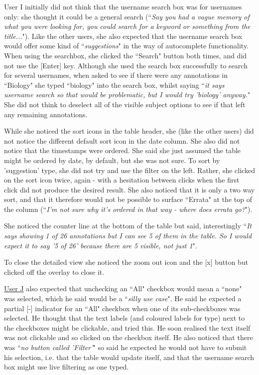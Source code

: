 User I initially did not think that the username search box was for usernames only: she thought it could be a general search (``\textit{Say you had a vague memory of what you were looking for, you could search for a keyword or something from the title...}"). Like the other users, she also expected that the username search box would offer some kind of ``\textit{suggestions}" in the way of autocomplete functionality. When using the searchbox, she clicked the ``Search" button both times, and did not use the [Enter] key. Although she used the search box successfully to search for several usernames, when asked to see if there were any annotations in ``Biology" she typed ``biology" into the search box, whilst saying ``\textit{it says username search so that would be problematic, but I would try 'biology' anyway.}" She did not think to deselect all of the visible subject options to see if that left any remaining annotations. 

While she noticed the sort icons in the table header, she (like the other users) did not notice the different default sort icon in the date column. She also did not notice that the timestamps were ordered. She said she just assumed the table might be ordered by date, by default, but she was not sure. To sort by 'suggestion' type, she did not try and use the filter on the left. Rather, she clicked on the sort icon twice, again - with a hesitation between clicks when the first click did not produce the desired result. She also noticed that it is only a two way sort, and that it therefore would not be possible to surface ``Errata" at the top of the column (``\textit{I'm not sure why it's ordered in that way - where does errata go?}").

She noticed the counter line at the bottom of the table but said, interestingly ``\textit{It says showing 1 of 26 annotations but I can see 5 of them in the table. So I would expect it to say '5 of 26' because there are 5 visible, not just 1}". 

To close the detailed view she noticed the zoom out icon and the [x] button but clicked off  the overlay to close it. 

\underline{User J} also expected that unchecking an ``All" checkbox would mean a ``none" was selected, which he said would be a ``\textit{silly use case}". He said he expected a partial [-] indicator for an ``All" checkbox when one of its sub-checkboxes was selected. He thought that the text labels (and coloured labels for type) next to the checkboxes might be clickable, and tried this. He soon realised the text itself was not clickable and so clicked on the checkbox itself. He also noticed  that there was ``\textit{no button called 'Filter'}" so said he expected he would not have to submit his selection, i.e. that the table would update itself, and that the username search box might use live filtering as one typed. 

